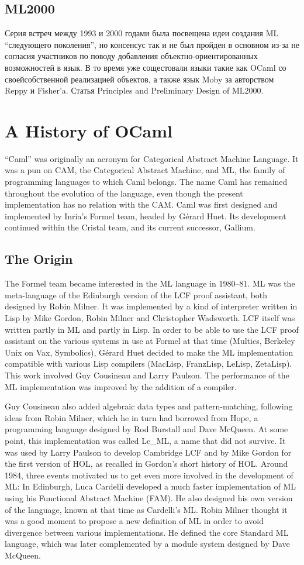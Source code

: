 \documentclass[14pt]{matmex-diploma-custom}
\begin{document}
\subsection{ML2000}
Серия встреч между 1993 и 2000 годами была посвещена идеи создания ML “следующего поколения”,  но консенсус так и не был пройден в основном из-за не согласия участников по поводу добавления объектно-ориентированных возможностей в язык.
В то время уже сощестовали языки такие как OCaml со своейсобственной реализацией объектов, а также язык Moby за авторством Reppy и Fisher’a. 
Статья Principles and Preliminary Design of ML2000. 


\section{A History of OCaml}
“Caml” was originally an acronym for Categorical Abstract Machine Language. It was a pun on CAM, the Categorical Abstract Machine, and ML, the family of programming languages to which Caml belongs. The name Caml has remained throughout the evolution of the language, even though the present implementation has no relation with the CAM.
Caml was first designed and implemented by Inria's Formel team, headed by Gérard Huet. Its development continued within the Cristal team, and its current successor, Gallium.
\subsection{The Origin}
The Formel team became interested in the ML language in 1980–81. ML was the meta-language of the Edinburgh version of the LCF proof assistant, both designed by Robin Milner. It was implemented by a kind of interpreter written in Lisp by Mike Gordon, Robin Milner and Christopher Wadsworth. LCF itself was written partly in ML and partly in Lisp. In order to be able to use the LCF proof assistant on the various systems in use at Formel at that time (Multics, Berkeley Unix on Vax, Symbolics), Gérard Huet decided to make the ML implementation compatible with various Lisp compilers (MacLisp, FranzLisp, LeLisp, ZetaLisp). This work involved Guy Cousineau and Larry Paulson. The performance of the ML implementation was improved by the addition of a compiler.

Guy Cousineau also added algebraic data types and pattern-matching, following ideas from Robin Milner, which he in turn had borrowed from Hope, a programming language designed by Rod Burstall and Dave McQueen. At some point, this implementation was called Le\_ML, a name that did not survive. It was used by Larry Paulson to develop Cambridge LCF and by Mike Gordon for the first version of HOL, as recalled in Gordon's short history of HOL.
Around 1984, three events motivated us to get even more involved in the development of ML:
In Edinburgh, Luca Cardelli developed a much faster implementation of ML using his Functional Abstract Machine (FAM). He also designed his own version of the language, known at that time as Cardelli's ML.
Robin Milner thought it was a good moment to propose a new definition of ML in order to avoid divergence between various implementations. He defined the core Standard ML language, which was later complemented by a module system designed by Dave McQueen.
\end{document}
